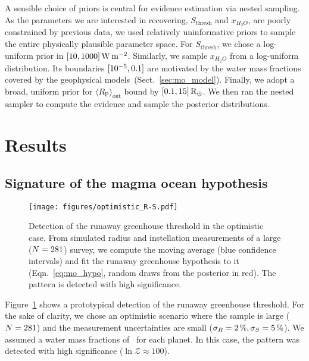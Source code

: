 \documentclass[modern]{aastex631}
\begin{document}
A sensible choice of priors is central for evidence estimation via nested sampling.
As the parameters we are interested in recovering, $S_\mathrm{thresh}$ and $x_{H_2O}$, are poorly constrained by previous data, we used relatively uninformative priors to sample the entire physically plausible parameter space.
For $S_\mathrm{thresh}$, we chose a log-uniform prior in $[10,1000]\, \SI{}{\watt\per\meter\squared}$.
Similarly, we sample $x_{H_2O}$ from a log-uniform distribution.
Its boundaries $[10^{-5}, 0.1]$ are motivated by the water mass fractions covered by the geophysical models~(Sect.~\ref{sec:mo_model}).
Finally, we adopt a broad, uniform prior for $\langle R_\mathrm{P}\rangle_\mathrm{out}$ bound by $[0.1, 15] \, \mathrm{R_\oplus}$.
We then ran the nested sampler to compute the evidence and sample the posterior distributions.



\section{Results}
\subsection{Signature of the magma ocean hypothesis}



\begin{figure}[ht!]
    \begin{centering}
        \texttt{[image: figures/optimistic\_R-S.pdf]}
        \caption{
        Detection of the runaway greenhouse threshold in the optimistic case.
        From simulated radius and instellation measurements of a large ($N = 281$) survey, we compute the moving average (blue confidence intervals) and fit the runaway greenhouse hypothesis to it (Eqn.~\ref{eq:mo_hypo}, random draws from the posterior in red).
            The pattern is detected with high significance.
        }
        \label{fig:optimistic_R-S}
    \end{centering}
\end{figure}
Figure~\ref{fig:optimistic_R-S} shows a prototypical detection of the runaway greenhouse threshold.
For the sake of clarity, we chose an optimistic scenario where the sample is large ($N = 281$) and the measurement uncertainties are small ($\sigma_{R} = \SI{2}{\percent}, \sigma_{S} = \SI{5}{\percent}$).
We assumed a water mass fractions of \wrr\ for each planet.
In this case, the pattern was detected with high significance ($\ln \mathcal{Z} \approx 100$).
\end{document}
